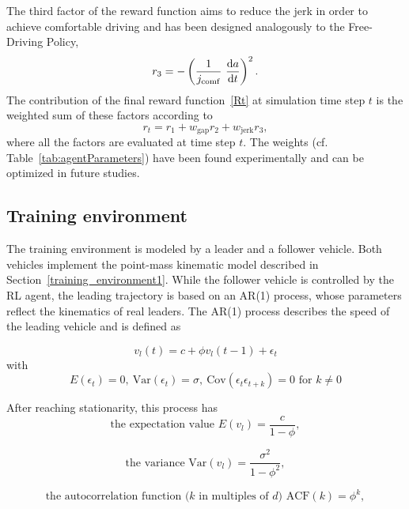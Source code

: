 \documentclass[review]{elsarticle}
\providecommand{\martin}[1]{#1}                  %
\providecommand{\sub}[1]{_{\mathrm{#1}}}  %
\providecommand{\3}{{\ss}}
\begin{document}
The third factor of the reward function aims to reduce the jerk in
order to achieve comfortable driving and has been designed analogously to the Free-Driving Policy, 
\begin{equation}
\label{eq:r3_CFP}
r_3 = -\left(\frac{1}{j\sub{comf}} \ \dv{a}{t}\right)^2.
\end{equation}
%
The contribution of the final reward function~\eqref{Rt}  at simulation time step $t$ is the weighted
sum of these factors according to
\begin{equation}
\label{rt2}
r_t = r_1 + w\sub{gap}r_2+w\sub{jerk}r_3,
\end{equation}
where all the factors are evaluated at time step $t$. The weights (cf.
Table~\ref{tab:agentParameters}) have been found experimentally and
can be optimized in future studies.




\subsection{Training environment}
\label{training_environment2}
The training environment is modeled by a leader and a follower vehicle. Both vehicles implement the point-mass kinematic model described in Section~\ref{training_environment1}. While the follower vehicle is controlled by the RL agent, the  leading trajectory is based on an AR(1) process, whose parameters
reflect the kinematics of real leaders. The AR(1) process describes
the speed of the leading vehicle and is defined as 

\begin{equation} \label{eq:AR1}
v_l(t) = c+\phi v_l(t-1)+ \epsilon_t
\end{equation}
with
\begin{equation}
E(\epsilon_t) = 0, \ \text{Var}(\epsilon_t) = \sigma, \ 
\text{Cov}(\epsilon_t\epsilon_{t+k})=0 \text{ for }k\neq 0
\end{equation}

After reaching stationarity, this process has 
\begin{equation}
\label{eq:E_AR1}
\text{the expectation value }E(v_l) = \frac{c}{1-\phi}, 
\end{equation}

\begin{equation}
\label{eq:V_AR1}
\text{the variance }\text{Var}(v_l) = \frac{\sigma^2}{1-\phi^2}, 
\end{equation}

\begin{equation}
\label{eq:ACF_AR1}
\martin{\text{the autocorrelation function ($k$ in multiples of $d$) }
\text{ACF}(k) = \phi^{k}}, 
\end{equation}
\end{document}
